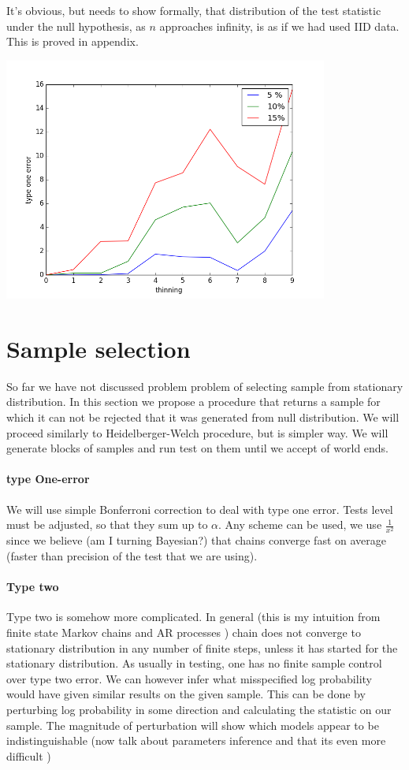 \documentclass{article}
\begin{document}
It's obvious, but needs to show formally, that distribution of the test statistic under the null hypothesis, as $n$ approaches infinity, is as if we had used IID data. This is proved in appendix.

\includegraphics[width=0.8\textwidth]{type1.png}

\section{Sample selection}
So far we have not discussed problem problem of selecting sample from stationary distribution. In this section we propose a procedure that returns a sample for which it can not be rejected that it was generated from null distribution. We will proceed similarly to Heidelberger-Welch procedure, but is simpler way. We will generate blocks of samples and run test on them until we accept of world ends. 

\paragraph{type One-error}
We will use simple Bonferroni correction to deal with type one error. Tests level must be adjusted, so that they sum up to $\alpha$. Any scheme can be used, we use $\frac{1}{x^2}$ since we believe (am I turning  Bayesian?) that chains converge fast on average (faster than precision of the test that we are using).   

\paragraph{Type two}
Type two is somehow more complicated. In general (this is my intuition from finite state Markov chains and AR processes ) chain does not converge to stationary distribution in any number of finite steps, unless it has started for the stationary distribution. As usually in testing, one has no finite sample control over type two error. We can however infer what misspecified log probability would have given similar results on the given sample. This can be done by perturbing log probability in some direction and calculating the statistic on our sample. The magnitude of perturbation will show which models appear to be indistinguishable (now talk about parameters inference and that its even more difficult )    









\end{document}
